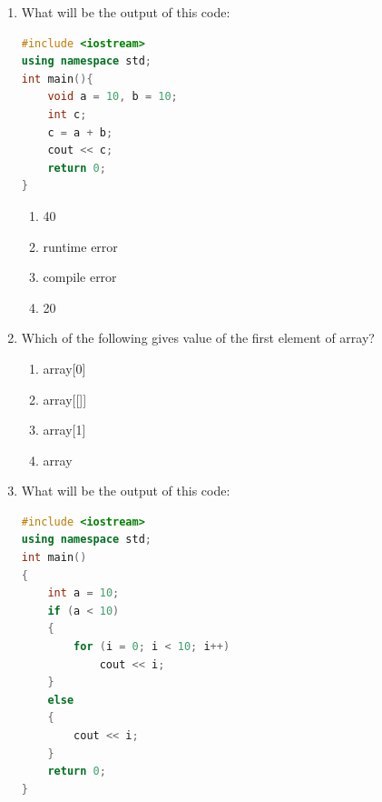 \documentclass[10pt]{article}
\begin{document}
\begin{enumerate}
\begin{lstlisting}[language=C++]
\end{lstlisting}
\begin{multicols}{4}
\begin{enumerate}
    \item Compile error
    \item Hi
    \item HelloHi
    \item Hello
\end{enumerate}
\end{multicols}








\item What will be the output of this code:
\begin{lstlisting}[language=C++]
#include <iostream>
using namespace std;
int main(){
    void a = 10, b = 10;
    int c;
    c = a + b;
    cout << c;
    return 0;
}

\end{lstlisting}
\begin{multicols}{4}
\begin{enumerate}
    \item 40
    \item runtime error
    \item compile error
    \item 20
\end{enumerate}
\end{multicols}







\item Which of the following gives  value of the first element of array?
\begin{multicols}{4}
\begin{enumerate}
    \item array[0]
    \item array[[]]         
    \item array[1]
    \item array
\end{enumerate}
\end{multicols}







\item What will be the output of this code:
\begin{lstlisting}[language=C++]
#include <iostream>
using namespace std;
int main()
{
    int a = 10;
    if (a < 10) 
    {
        for (i = 0; i < 10; i++)
            cout << i;
    }
    else 
    {
        cout << i;
    }
    return 0;
}


\end{lstlisting}
\end{enumerate}
\end{document}
